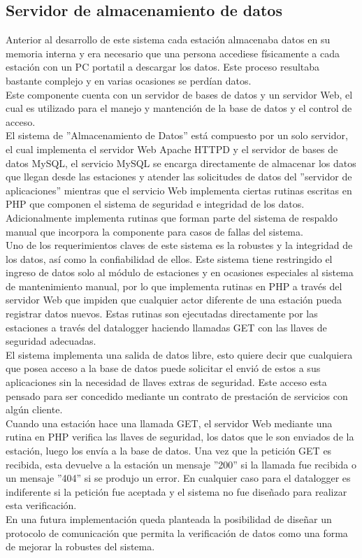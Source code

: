 \subsection{Servidor de almacenamiento de datos}
Anterior al desarrollo de este sistema cada estación almacenaba datos en su memoria interna y era necesario que una persona accediese físicamente a cada estación con un PC portatil a descargar los datos. Este proceso resultaba bastante complejo y en varias ocasiones se perdían datos.\\ Este componente cuenta con un servidor de bases de datos y un servidor Web, el cual es utilizado para el manejo y mantención de la base de datos y el control de acceso.\\

El sistema de ''Almacenamiento de Datos'' está compuesto por un solo servidor, el cual implementa el servidor Web Apache HTTPD y el servidor de bases de datos MySQL, el servicio MySQL se encarga directamente de almacenar los datos que llegan desde las estaciones y atender las solicitudes de datos del ''servidor de aplicaciones'' mientras que el servicio Web implementa ciertas rutinas escritas en PHP que componen el sistema de seguridad e integridad de los datos. Adicionalmente implementa rutinas que forman parte del sistema de respaldo manual que incorpora la componente para casos de fallas del sistema.\\

Uno de los requerimientos claves de este sistema es la robustes y la integridad de los datos, así como la confiabilidad de ellos. Este sistema tiene restringido el ingreso de datos solo al módulo de estaciones y en ocasiones especiales al sistema de mantenimiento manual, por lo que implementa rutinas en PHP a través del servidor Web que impiden que cualquier actor diferente de una estación pueda registrar datos nuevos. Estas rutinas son ejecutadas directamente por las estaciones a través del datalogger haciendo llamadas GET con las llaves de seguridad adecuadas.\\
El sistema implementa una salida de datos libre, esto quiere decir que cualquiera que posea acceso a la base de datos puede solicitar el envió de estos a sus aplicaciones sin la necesidad de llaves extras de seguridad. Este acceso esta pensado para ser concedido mediante un contrato de prestación de servicios con algún cliente.\\

Cuando una estación hace una llamada GET, el servidor Web mediante una rutina en PHP verifica las llaves de seguridad, los datos que le son enviados de la estación, luego los envía a la base de datos. Una vez que la petición GET es recibida, esta devuelve a la estación un mensaje ''200'' si la llamada fue recibida o un mensaje ''404'' si se produjo un error. En cualquier caso para el datalogger es indiferente si la petición fue aceptada y el sistema no fue diseñado para realizar esta verificación.\\ En una futura implementación queda planteada la posibilidad de diseñar un protocolo de comunicación que permita la verificación de datos como una forma de mejorar la robustes del sistema.\\

